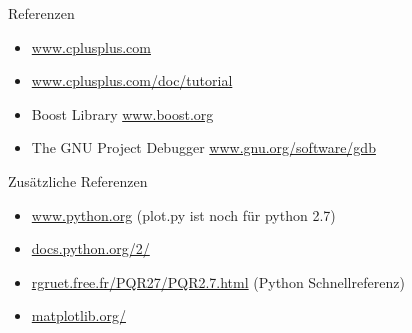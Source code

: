\documentclass[10pt]{beamer}
\begin{document}
\begin{frame}
Referenzen
\begin{itemize}
\item \url{www.cplusplus.com}
\item \url{www.cplusplus.com/doc/tutorial}
\item Boost Library \url{www.boost.org}
\item The GNU Project Debugger \url{www.gnu.org/software/gdb}
\end{itemize}
Zusätzliche Referenzen
\begin{itemize}
\item \url{www.python.org} (plot.py ist noch für python 2.7)
\item \url{docs.python.org/2/}
\item \url{rgruet.free.fr/PQR27/PQR2.7.html} (Python Schnellreferenz)
\item \url{matplotlib.org/}
\end{itemize}
\end{frame}
\end{document}
